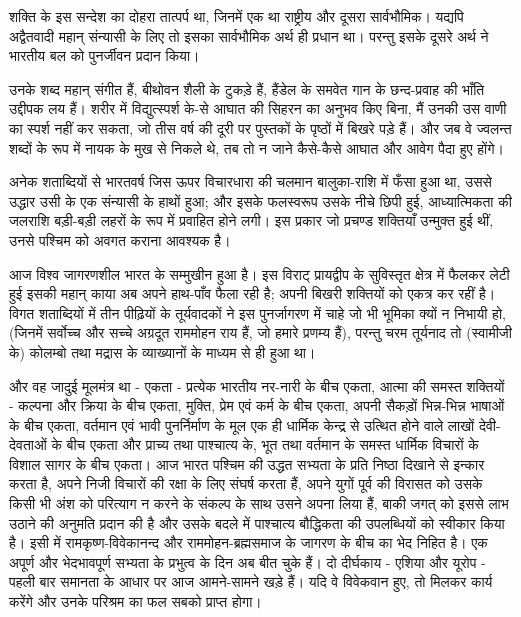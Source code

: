 शक्ति के इस सन्देश का दोहरा तात्पर्प था, जिनमें एक था राष्ट्रीय और दूसरा सार्वभौमिक। यद्यपि अद्वैतवादी महान् संन्यासी के लिए तो इसका सार्वभौमिक अर्थ ही प्रधान था। परन्तु इसके दूसरे अर्थ ने भारतीय बल को पुनर्जीवन प्रदान किया। 

\delimiter

उनके शब्द महान् संगीत हैं, बीथोवन शैली के टुकड़े हैं, हैंडेल के समवेत गान के छन्द-प्रवाह की भाँति उद्दीपक लय हैं। शरीर में विद्युत्स्पर्श के-से आघात की सिहरन का अनुभव किए बिना, मैं उनकी उस वाणी का स्पर्श नहीं कर सकता, जो तीस वर्ष की दूरी पर पुस्तकों के पृष्ठों में बिखरे पड़े हैं। और जब वे ज्वलन्त शब्दों के रूप में नायक के मुख से निकले थे, तब तो न जाने कैसे-कैसे आघात और आवेग पैदा हुए होंगे। 

\delimiter

अनेक शताब्दियों से भारतवर्ष जिस ऊपर विचारधारा की चलमान बालुका-राशि में फँसा हुआ था, उससे उद्धार उसी के एक संन्यासी के हाथों हुआ; और इसके फलस्वरूप उसके नीचे छिपी हुई, आध्यात्मिकता की जलराशि बड़ी-बड़ी लहरों के रूप में प्रवाहित होने लगी। इस प्रकार जो प्रचण्ड शक्तियाँ उन्मुक्त हुई थीं, उनसे पश्चिम को अवगत कराना आवश्यक है। 

आज विश्व जागरणशील भारत के सम्मुखीन हुआ है। इस विराट् प्रायद्वीप के सुविस्तृत क्षेत्र में फैलकर लेटी हुई इसकी महान् काया अब अपने हाथ-पाँव फैला रही है; अपनी बिखरी शक्तियों को एकत्र कर रहीं है। विगत शताब्दियों में तीन पीढ़ियों के तूर्यवादकों ने इस पुनर्जागरण में चाहे जो भी भूमिका क्यों न निभायी हो, (जिनमें सर्वोच्च और सच्चे अग्रदूत राममोहन राय हैं, जो हमारे प्रणम्य हैं), परन्तु चरम तूर्यनाद तो (स्वामीजी के) कोलम्बो तथा मद्रास के व्याख्यानों के माध्यम से ही हुआ था। 

और वह जादुई मूलमंत्र था - एकता - प्रत्येक भारतीय नर-नारी के बीच एकता, आत्मा की समस्त शक्तियों - कल्पना और क्रिया के बीच एकता, मुक्ति, प्रेम एवं कर्म के बीच एकता, अपनी सैकड़ों भिन्न-भिन्न भाषाओं के बीच एकता, वर्तमान एवं भावी पुनर्निर्माण के मूल एक ही धार्मिक केन्द्र से उत्थित होने वाले लाखों देवी-देवताओं के बीच एकता और प्राच्य तथा पाश्चात्य के, भूत तथा वर्तमान के समस्त धार्मिक विचारों के विशाल सागर के बीच एकता। आज भारत पश्चिम की उद्धत सभ्यता के प्रति निष्ठा दिखाने से इन्कार करता है, अपने निजी विचारों की रक्षा के लिए संघर्ष करता हैं, अपने युगों पूर्व की विरासत को उसके किसी भी अंश को परित्याग न करने के संकल्प के साथ उसने अपना लिया हैं, बाकी जगत् को इससे लाभ उठाने की अनुमति प्रदान की है और उसके बदले में पाश्चात्य बौद्धिकता की उपलब्धियों को स्वीकार किया है। इसी में रामकृष्ण-विवेकानन्द और राममोहन-ब्रह्मसमाज के जागरण के बीच का भेद निहित है। एक अपूर्ण और भेदभावपूर्ण सभ्यता के प्रभुत्व के दिन अब बीत चुके हैं। दो दीर्घकाय - एशिया और यूरोप - पहली बार समानता के आधार पर आज आमने-सामने खड़े हैं। यदि वे विवेकवान हुए, तो मिलकर कार्य करेंगे और उनके परिश्रम का फल सबको प्राप्त होगा। 


